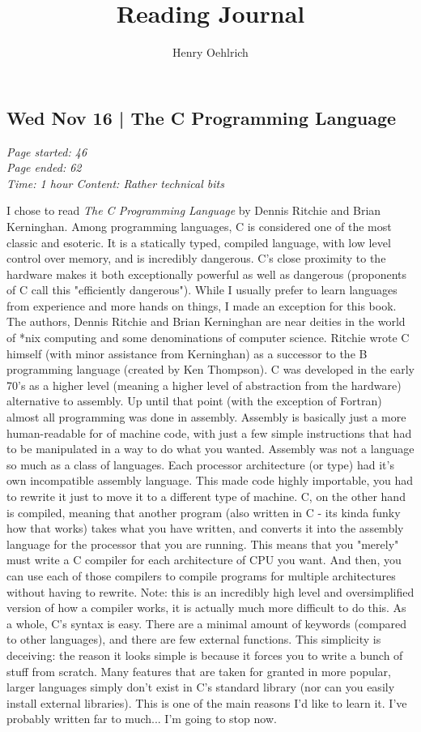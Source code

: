 \documentclass{article}
\title{Reading Journal}
\author{Henry Oehlrich}
\begin{document}
\maketitle{}

\subsection{Wed Nov 16 | The C Programming Language}
\textit{Page started: 46 \\
        Page ended: 62 \\
        Time: 1 hour
        Content: Rather technical bits \\
}

I chose to read \textit{The C Programming Language} by Dennis Ritchie and Brian
Kerninghan. Among programming languages, C is considered one of the most
classic and esoteric. It is a statically typed, compiled language, with low
level control over memory, and is incredibly dangerous. C's close proximity to
the hardware makes it both exceptionally powerful as well as dangerous
(proponents of C call this "efficiently dangerous"). While I usually prefer to
learn languages from experience and more hands on things, I made an exception
for this book. The authors, Dennis Ritchie and Brian Kerninghan are near
deities in the world of *nix computing and some denominations of computer
science. Ritchie wrote C himself (with minor assistance from Kerninghan) as a
successor to the B programming language (created by Ken Thompson). C was
developed in the early 70's as a higher level (meaning a higher level of
abstraction from the hardware) alternative to assembly. Up until that point
(with the exception of Fortran) almost all programming was done in assembly.
Assembly is basically just a more human-readable for of machine code, with just
a few simple instructions that had to be manipulated in a way to do what you
wanted. Assembly was not a language so much as a class of languages. Each
processor architecture (or type) had it's own incompatible assembly language.
This made code highly importable, you had to rewrite it just to move it to a
different type of machine. C, on the other hand is compiled, meaning that
another program (also written in C - its kinda funky how that works) takes what
you have written, and converts it into the assembly language for the processor
that you are running. This means that you "merely" must write a C compiler for
each architecture of CPU you want. And then, you can use each of those
compilers to compile programs for multiple architectures without having to
rewrite. Note: this is an incredibly high level and oversimplified version of
how a compiler works, it is actually much more difficult to do this. As a
whole, C's syntax is easy. There are a minimal amount of keywords (compared to
other languages), and there are few external functions. This simplicity is
deceiving: the reason it looks simple is because it forces you to write a bunch
of stuff from scratch. Many features that are taken for granted in more
popular, larger languages simply don't exist in C's standard library (nor can
you easily install external libraries). This is one of the main reasons I'd
like to learn it. I've probably written far to much... I'm going to stop now.
\end{document}
